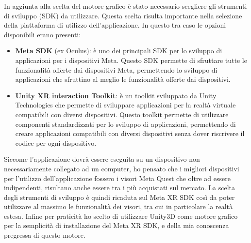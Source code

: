 In aggiunta alla scelta del motore grafico è stato necessario scegliere gli
strumenti di sviluppo (SDK) da utilizzare. Questa scelta risulta importante nella
selezione della piattaforma di utilizzo dell'applicazione. In questo tra caso le
opzioni disponibili erano presenti:
\begin{itemize}
  \item \textbf{Meta SDK} (ex Oculus): è uno dei principali SDK per lo sviluppo di
    applicazioni per i dispositivi Meta. Questo SDK permette di sfruttare tutte
    le funzionalità offerte dai dispositivi Meta, permettendo lo sviluppo di applicazioni
    che sfruttino al meglio le funzionalità offerte dai dispositivi.

  \item \textbf{Unity XR interaction Toolkit}: è un toolkit sviluppato da Unity Technologies
    che permette di sviluppare applicazioni per la realtà virtuale compatibili con
    diversi dispositivi. Questo toolkit permette di utilizzare componenti
    standardizzati per lo sviluppo di applicazioni, permettendo di creare applicazioni
    compatibili con diversi dispositivi senza dover riscrivere il codice per ogni
    dispositivo.
\end{itemize}

Siccome l'applicazione dovrà essere eseguita su un dispositivo non
necessariamente collegato ad un computer, ho pensato che i migliori dispositivi per
l'utilizzo dell'applicazione fossero i visori Meta Quest che oltre ad essere indipendenti,
risultano anche essere tra i più acquistati sul mercato. La scelta degli strumenti
di sviluppo è quindi ricaduta sul Meta XR SDK così da poter utilizzare al massimo
le funzionalità dei visori, tra cui in particolare la realtà estesa. Infine per praticità
ho scelto di utilizzare Unity3D come motore grafico per la semplicità di installazione
del Meta XR SDK, e della mia conoscenza pregressa di questo motore.